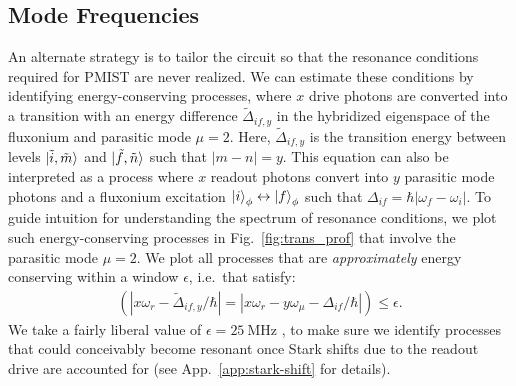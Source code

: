 \documentclass[%
reprint,
superscriptaddress,
 amsmath,amssymb,
 aps,
 prx,
longbibliography,
floatfix,
]{revtex4-2}
\begin{document}
\subsection{Mode Frequencies}\label{mode-frequencies}

An alternate strategy is to tailor the circuit so that the resonance conditions required for PMIST are never realized. We can estimate these conditions by identifying energy-conserving processes, where $x$ drive photons are converted into a transition with an energy difference $\tilde{\Delta}_{if,y}$ in the hybridized eigenspace of the fluxonium and parasitic mode $\mu=2$. Here, $\tilde{\Delta}_{if,y}$ is the transition energy between levels $\ket{\tilde{i},\tilde{m}}$ and $\ket{\tilde{f},\tilde{n}}$ such that $|m-n|=y$. 
This equation can also be interpreted as a process where $x$ readout photons convert into $y$ parasitic mode photons and a fluxonium excitation $\ket{i}_\phi \leftrightarrow \ket{f}_\phi$ such that $\Delta_{if}=\hbar|\omega_f-\omega_i|$. To guide intuition for understanding the spectrum of resonance conditions, we plot such energy-conserving processes in Fig.~\ref{fig:trans_prof} that involve the parasitic mode $\mu=2$.
We plot all processes that are {\it approximately} energy conserving within a window $\epsilon$, i.e.~that satisfy:
\begin{align}
\left(
    |x\omega_r-\tilde{\Delta}_{if,y}/\hbar| = 
|x\omega_r-y\omega_\mu-\Delta_{if}/\hbar| \right) \le \epsilon.
\label{eq:En_cons}
\end{align}
We take a fairly liberal value of $\epsilon = 25 \ \textrm{MHz}$ , to make sure we identify processes that could conceivably become resonant once Stark shifts due to the readout drive are accounted for (see App.~\ref{app:stark-shift} for details).
\end{document}
